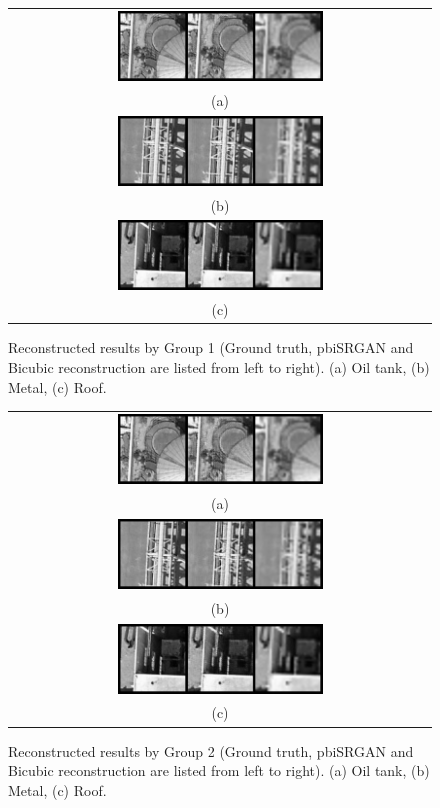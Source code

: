 \documentclass[10pt,twocolumn,letterpaper]{article}
\begin{document}
\begin{figure}%
\centering\begin{tabular}{c}
\includegraphics[width=0.5\textwidth]{fig20-a}\\
(a)\\[3ex]%
\includegraphics[width=0.5\textwidth]{fig20-b}\\
(b)\\[3ex]
\includegraphics[width=0.5\textwidth]{fig20-c}\\
(c)
\end{tabular}
\caption{Reconstructed results by Group 1 (Ground truth, pbiSRGAN and Bicubic reconstruction are listed from left to right). (a) Oil tank, (b) Metal, (c) Roof.}%
\label{fig20}%
\end{figure}

\begin{figure}%
\centering\begin{tabular}{c}
\includegraphics[width=0.5\textwidth]{fig21-a}\\
(a)\\[3ex]%
\includegraphics[width=0.5\textwidth]{fig21-b}\\
(b)\\[3ex]
\includegraphics[width=0.5\textwidth]{fig21-c}\\
(c)
\end{tabular}
\caption{Reconstructed results by Group 2 (Ground truth, pbiSRGAN and Bicubic reconstruction are listed from left to right). (a) Oil tank, (b) Metal, (c) Roof.}%
\label{fig21}%
\end{figure}
\end{document}
